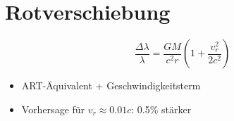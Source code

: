 \section{Rotverschiebung}
\[ \frac{\Delta \lambda}{\lambda} = \frac{GM}{c^2 r} \left(1 + \frac{v_r^2}{2c^2}\right) \]

\begin{itemize}
    \item ART-Äquivalent + Geschwindigkeitsterm
    \item Vorhersage für $v_r \approx 0.01c$: 0.5\% stärker
\end{itemize}